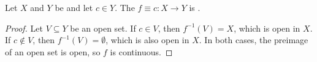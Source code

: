 \begin{proposition} \label{proposition:constant_function_is_continuous_between_topological_spaces}
    Let $X$ and $Y$ be  and let $c \in Y$. The  $f \equiv c : X \to Y$ is .
\end{proposition}
\begin{proof}
    Let $V \subseteq Y$ be an open set. If $c \in V$, then $f^{-1}(V) = X$, which is open in $X$. If $c \notin V$, then $f^{-1}(V) = \emptyset$, which is also open in $X$. In both cases, the preimage of an open set is open, so $f$ is continuous.
\end{proof}